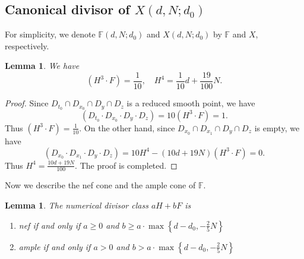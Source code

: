 \documentclass[a4paper,11pt]{amsart}
\newtheorem{lem}[thm]{Lemma}
\theoremstyle{definition}
\theoremstyle{remark}
\numberwithin{equation}{section}
\begin{document}
\subsection{Canonical divisor of $X(d, N; d_0)$} \label{subsection: KX}
For simplicity, we denote $\mathbb{F}(d, N; d_0)$ and $X(d, N; d_0)$ by $\mathbb{F}$ and $X$, respectively. 
\begin{lem} \label{lem: intersection}
	We have
	$$
	(H^3 \cdot F) = \frac{1}{10}, \quad H^4 = \frac{1}{10}d + \frac{19}{100}N.
	$$
\end{lem}

\begin{proof} 
	Since $D_{t_0} \cap D_{x_0} \cap D_y \cap D_z$ is a reduced smooth point, we have
	$$
	(D_{t_0} \cdot D_{x_0} \cdot D_y \cdot D_z) = 10(H^3 \cdot F) = 1.
	$$
	Thus $(H^3 \cdot F) = \frac{1}{10}$. On the other hand, since $D_{x_0} \cap D_{x_1} \cap D_y \cap D_z$ is empty, we have
	$$
	(D_{x_0} \cdot D_{x_1} \cdot D_y \cdot D_z) = 10H^4 - (10d + 19N)(H^3 \cdot F) = 0.
	$$
	Thus $H^4 = \frac{10d + 19N}{100}$. The proof is completed.
\end{proof}

Now we describe the nef cone and the ample cone of $\mathbb{F}$.
\begin{lem} \label{lem: nef and ample cone}
	The numerical divisor class $aH + bF$ is 
	\begin{enumerate}
		\item nef if and only if $a \ge 0$ and $b \ge a \cdot \max\left\{d-d_0, -\frac25N \right\}$
		\item ample if and only if $a > 0$ and $b > a \cdot \max\left\{d-d_0, -\frac25N\right\}$
	\end{enumerate}
\end{lem}
\end{document}
